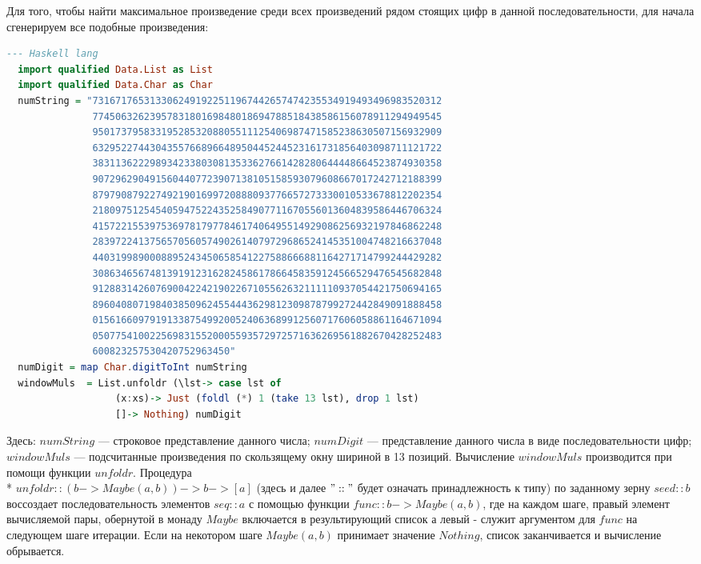 \documentclass[11pt,a4paper]{article}
\begin{document}
Для того, чтобы найти максимальное произведение среди всех произведений рядом стоящих цифр в данной последовательности, для начала сгенерируем все подобные произведения:
\begin{lstlisting}[language=Haskell, frame=single]
  --- Haskell lang
  import qualified Data.List as List
  import qualified Data.Char as Char
  numString = "7316717653133062491922511967442657474235534919493496983520312
               7745063262395783180169848018694788518438586156078911294949545
               9501737958331952853208805511125406987471585238630507156932909
               6329522744304355766896648950445244523161731856403098711121722
               3831136222989342338030813533627661428280644448664523874930358
               9072962904915604407723907138105158593079608667017242712188399
               8797908792274921901699720888093776657273330010533678812202354
               2180975125454059475224352584907711670556013604839586446706324
               4157221553975369781797784617406495514929086256932197846862248
               2839722413756570560574902614079729686524145351004748216637048
               4403199890008895243450658541227588666881164271714799244429282
               3086346567481391912316282458617866458359124566529476545682848
               9128831426076900422421902267105562632111110937054421750694165
               8960408071984038509624554443629812309878799272442849091888458
               0156166097919133875499200524063689912560717606058861164671094
               0507754100225698315520005593572972571636269561882670428252483
               600823257530420752963450"
  numDigit = map Char.digitToInt numString
  windowMuls  = List.unfoldr (\lst-> case lst of
                   (x:xs)-> Just (foldl (*) 1 (take 13 lst), drop 1 lst) 
                   []-> Nothing) numDigit
\end{lstlisting}
Здесь: $numString$ --- строковое представление данного числа; $numDigit$ --- представление данного числа в виде последовательности цифр; $windowMuls$ --- подсчитанные произведения по скользящему окну шириной в 13 позиций. Вычисление $windowMuls$ производится при помощи функции $unfoldr$. Процедура \\*
$unfoldr :: (b -> Maybe (a, b)) -> b -> [a] $ (здесь и далее $"::"$ будет означать принадлежность к типу)
по заданному зерну $seed :: b$ воссоздает последовательность элементов $seq :: a$ с помощью функции $func :: b -> Maybe (a, b)$, где на каждом шаге, правый элемент вычисляемой пары, обернутой в монаду $Maybe$ включается в результирующий список  а левый - служит аргументом для $func$ на следующем шаге итерации. Если на некотором шаге $Maybe(a,b)$ принимает значение $Nothing$, список заканчивается и вычисление обрывается. 
\end{document}
